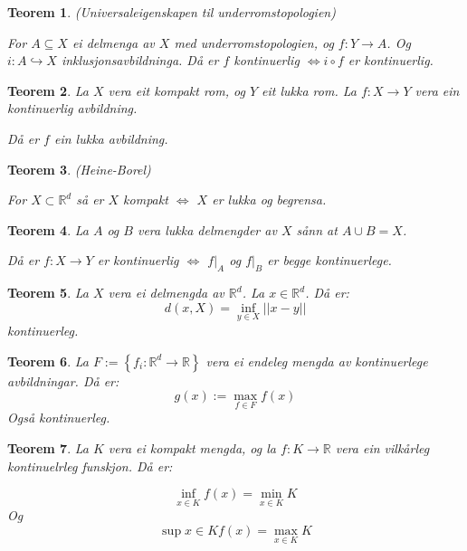 \documentclass[a4paper, 12pt, norsk]{article}
\theoremstyle{plain}
\newtheorem{theorem}{Teorem}[section]
\theoremstyle{definition}
\newcommand{\Rb}{\mathbb{R}}
\newcommand{\union}{ \mathop{\cup}\limits }
\newcommand{\set}[1]{ \left \{ #1 \right \} } %
\begin{document}
\begin{theorem} \label{thm:universal-eigenskap-underromstopologi}
	(Universaleigenskapen til underromstopologien)

	For \( A \subseteq X \) ei delmenga av \( X \) med underromstopologien, og \( f: Y \to A \). Og \( i: A \hookrightarrow X \) inklusjonsavbildninga. Då er \( f \) kontinuerlig  \( \iff i \circ f \) er kontinuerlig.
\end{theorem}

\begin{theorem} \label{thm:closed-map-lemma}
	La \( X \) vera eit kompakt rom, og \( Y \) eit lukka rom. La \( f: X \to Y \) vera ein kontinuerlig avbildning.

	Då er \( f \) ein lukka avbildning.
\end{theorem}

\begin{theorem} \label{thm:heine-borel}
	(Heine-Borel)

	For \( X \subset \Rb^d \) så er \( X \) kompakt \( \iff \) \( X \) er lukka og begrensa.
\end{theorem}

\begin{theorem} \label{thm:pasting-lemma}
	La \( A \) og \( B \) vera lukka delmengder av \( X \) sånn at \( A \union B = X \). 
	
	Då er \( f: X \to Y \) er kontinuerlig \( \iff \) \( f|_A \) og \( f|_B \) er begge kontinuerlege.
\end{theorem}

\begin{theorem} \label{thm:distanse-er-kont}
	La \( X \) vera ei delmengda av \( \Rb^d \). La \( x \in \Rb^d \). Då er:
	\[
		d(x, X) = \inf_{y \in X} ||x-y||
	\]
	kontinuerleg.
\end{theorem}

\begin{theorem} \label{thm:maksimum-av-kont-er-kont}
	La \( F := \set{f_i : \Rb^d \to \Rb} \) vera ei endeleg mengda av kontinuerlege avbildningar. Då er:
	\[
		g(x) := \max_{f \in F} f(x)
	\]
	Også kontinuerleg.
\end{theorem}

\begin{theorem} \label{thm:infimum-over-kompakt-er-min} \label{thm:supremum-over-kompakt-er-maks}
	La \( K \) vera ei kompakt mengda, og la \( f: K \to \Rb \) vera ein vilkårleg kontinuelrleg funskjon. Då er:

	\[
		\inf_{x \in K} f(x) = \min_{x \in K} K
	\]
	Og
	\[
		\sup{x \in K} f(x) = \max_{x \in K} K
	\]
\end{theorem}
\end{document}
